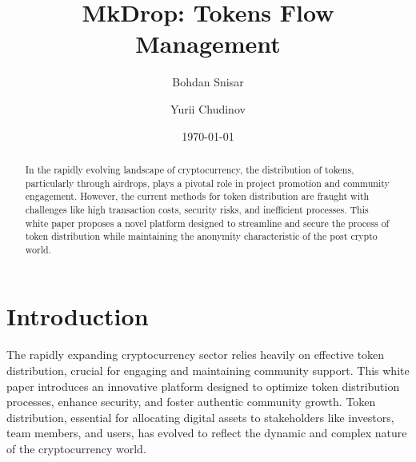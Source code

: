 \documentclass[12pt,oneside]{article}
\date{\small\today}
\title{%
  MkDrop: Tokens Flow Management\\
  \colorbox{mypink}{\small\sffamily\color{white}{White Paper}}}
\author{Bohdan Snisar \and Yurii Chudinov} %
\begin{document}
\raggedbottom

\maketitle
\begin{abstract}
  In the rapidly evolving landscape of cryptocurrency, the distribution of tokens, particularly through airdrops, 
  plays a pivotal role in project promotion and community engagement. However, the current methods for token 
  distribution   are fraught with challenges like high transaction costs, security risks, and inefficient processes. 
  This white paper proposes a novel platform designed to streamline and secure the process of token distribution 
  while maintaining the anonymity characteristic of the post crypto world.
\end{abstract}


\section{Introduction}

The rapidly expanding cryptocurrency sector relies heavily on effective token distribution,
crucial for engaging and maintaining community support. \cite{ziegler2023navigating} This white paper introduces an innovative 
platform designed to optimize token distribution processes, enhance security, and foster authentic 
community growth. Token distribution, essential for allocating digital assets to stakeholders like investors, 
team members, and users, has evolved to reflect the dynamic and complex nature of the cryptocurrency world. \cite{Fan_2023}
\end{document}

